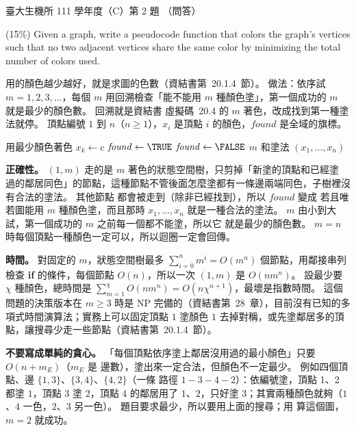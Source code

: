 \begin{pastexam}[label={px:ntu-111-bime-ds-02}]{臺大生機所 111 學年度（C）第 2 題}
（問答）

(15\%) Given a graph, write a pseudocode function that colors the graph's vertices such that no
two adjacent vertices share the same color by minimizing the total number of colors used.
\end{pastexam}

\begin{pastsoln}
用的顏色越少越好，就是求圖的色數（資結書第~20.1.4~節）。 做法：依序試 $m = 1, 2, 3, \ldots$，每個
$m$ 用回溯檢查「能不能用 $m$ 種顏色塗」，第一個成功的 $m$ 就是最少的顏色數。 回溯就是資結書
虛擬碼~20.4 的 $m$ 著色，改成找到第一種塗法就停。 頂點編號 $1$ 到 $n$（$n \ge 1$），$x_i$ 是頂點 $i$
的顏色，$\mathit{found}$ 是全域的旗標。

\begin{pseudo}{用最少顏色著色}
 
            \State $x_k \gets c$
                \State $\mathit{found} \gets \TRUE$
            \Else
                \State {}
            \EndIf
                \State \Return {}
            \EndIf
        \EndIf
    \EndFor
\EndProcedure
\Statex
{}
        \State $\mathit{found} \gets \FALSE$
        \State {}
            \State \Return $m$ 和塗法 $(x_1, \ldots, x_n)$
        \EndIf
    \EndFor
\EndFunction
\end{pseudo}

\textbf{正確性。} $(1, m)$ 走的是 $m$ 著色的狀態空間樹，只剪掉「新塗的頂點和已經塗
過的鄰居同色」的節點，這種節點不管後面怎麼塗都有一條邊兩端同色，子樹裡沒有合法的塗法。 其他節點
都會被走到（除非已經找到），所以 $\mathit{found}$ 變成 \TRUE{} 若且唯若圖能用 $m$ 種顏色塗，而且那時
$x_1, \ldots, x_n$ 就是一種合法的塗法。 $m$ 由小到大試，第一個成功的 $m$ 之前每一個都不能塗，所以它
就是最少的顏色數。 $m = n$ 時每個頂點一種顏色一定可以，所以迴圈一定會回傳。

\textbf{時間。} 對固定的 $m$，狀態空間樹最多 $\sum_{i=0}^{n} m^i = O(m^n)$ 個節點，用鄰接串列檢查
\textbf{if} 的條件，每個節點 $O(n)$，所以一次 $(1, m)$ 是 $O(n m^n)$。 設最少要 $\chi$
種顏色，總時間是 $\sum_{m=1}^{\chi} O(n m^n) = O(n \chi^{n+1})$，最壞是指數時間。 這個問題的決策版本在
$m \ge 3$ 時是 NP 完備的（資結書第~28~章），目前沒有已知的多項式時間演算法；實務上可以固定頂點 $1$
塗顏色 $1$ 去掉對稱，或先塗鄰居多的頂點，讓搜尋少走一些節點（資結書第~20.1.4~節）。

\textbf{不要寫成單純的貪心。} 「每個頂點依序塗上鄰居沒用過的最小顏色」只要 $O(n + m_E)$（$m_E$ 是
邊數），塗出來一定合法，但顏色不一定最少。 例如四個頂點、邊 $\{1, 3\}$、$\{3, 4\}$、$\{4, 2\}$（一條
路徑 $1 - 3 - 4 - 2$）：依編號塗，頂點 1、2 都塗 $1$，頂點 3 塗 $2$，頂點 4 的鄰居用了 $1$、$2$，只好塗
$3$；其實兩種顏色就夠（$1$、$4$ 一色，$2$、$3$ 另一色）。 題目要求最少，所以要用上面的搜尋；用
 算這個圖，$m = 2$ 就成功。
\end{pastsoln}
